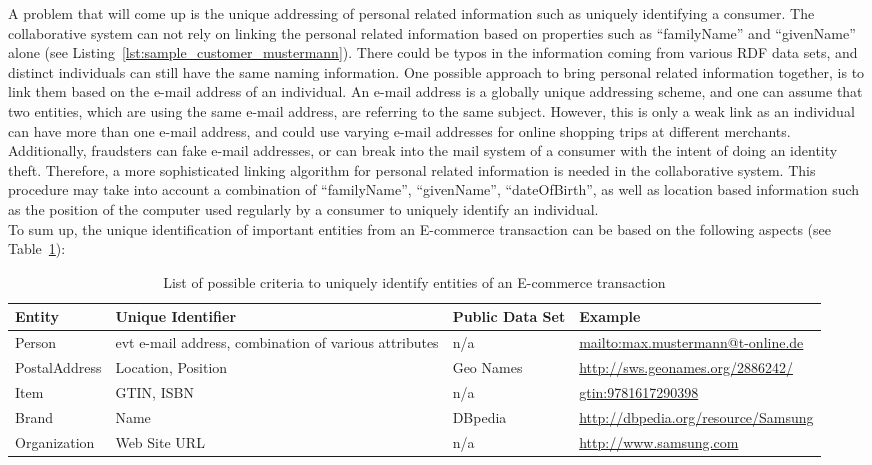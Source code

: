 A problem that will come up is the unique addressing of personal related information such as uniquely identifying a consumer. The collaborative system can not rely on linking the personal related information based on properties such as ``familyName'' and ``givenName'' alone (see Listing~\ref{lst:sample_customer_mustermann}). There could be typos in the information coming from various \gls{RDF} data sets, and distinct individuals can still have the same naming information. One possible approach to bring personal related information together, is to link them based on the e-mail address of an individual. An e-mail address is a globally unique addressing scheme, and one can assume that two entities, which are using the same e-mail address, are referring to the same subject. However, this is only a weak link as an individual can have more than one e-mail address, and could use varying e-mail addresses for online shopping trips at different merchants. Additionally, fraudsters can fake e-mail addresses, or can break into the mail system of a consumer with the intent of doing an identity theft. Therefore, a more sophisticated linking algorithm for personal related information is needed in the collaborative system. This procedure may take into account a combination of ``familyName'', ``givenName'', ``dateOfBirth'', as well as location based information such as the position of the computer used regularly by a consumer to uniquely identify an individual. \\

To sum up, the unique identification of important entities from an \gls{E-commerce} transaction can be based on the following aspects (see Table~\ref{tab:mapping_information}): \@

\begin{table}[H]
\centering
\begin{tabular}{lp{3.3cm}lp{4cm}}
\hline
\textbf{Entity} & \textbf{Unique Identifier} & \textbf{Public Data Set} & \textbf{Example} \\
\hline
Person & \gls{evt} e-mail address, combination of various attributes & n/a & \url{mailto:max.mustermann@t-online.de} \\
\hline
PostalAddress & Location, Position & Geo Names & \url{http://sws.geonames.org/2886242/} \\
\hline
Item & \gls{GTIN}, \gls{ISBN} & n/a & \url{gtin:9781617290398} \\
\hline
Brand & Name & DBpedia & \url{http://dbpedia.org/resource/Samsung} \\
\hline
Organization & Web Site \gls{URL} & n/a & \url{http://www.samsung.com} \\
\hline
\end{tabular}
\caption{List of possible criteria to uniquely identify entities of an \gls{E-commerce} transaction}
\label{tab:mapping_information}
\end{table}

